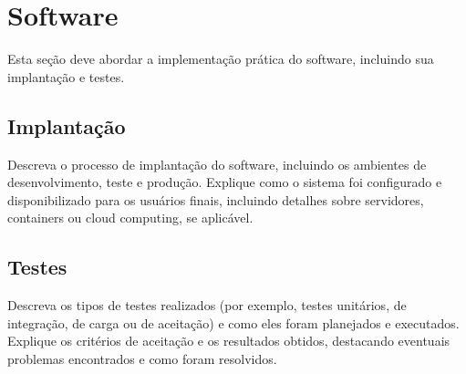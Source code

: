 

\chapter{Software}

Esta seção deve abordar a implementação prática do software, incluindo sua implantação e testes.

\section{Implantação}
Descreva o processo de implantação do software, incluindo os ambientes de desenvolvimento, teste e produção. Explique como o sistema foi configurado e disponibilizado para os usuários finais, incluindo detalhes sobre servidores, containers ou cloud computing, se aplicável.

\section{Testes}
Descreva os tipos de testes realizados (por exemplo, testes unitários, de integração, de carga ou de aceitação) e como eles foram planejados e executados. Explique os critérios de aceitação e os resultados obtidos, destacando eventuais problemas encontrados e como foram resolvidos.

